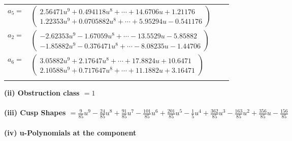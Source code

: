 \documentclass[1p]{elsarticle_modified}
\theoremstyle{definition}
\begin{document}
\begin{tabular}{m{7pt} m{180pt} m{7pt} m{180pt} }
\flushright $a_{5}=$&$\begin{pmatrix}2.56471 u^{9}+0.494118 u^{8}+\cdots+14.6706 u+1.21176\\1.22353 u^{9}+0.0705882 u^{8}+\cdots+5.95294 u-0.541176\end{pmatrix}$ \\
\flushright $a_{2}=$&$\begin{pmatrix}-2.62353 u^{9}-1.67059 u^{8}+\cdots-13.5529 u-5.85882\\-1.85882 u^{9}-0.376471 u^{8}+\cdots-8.08235 u-1.44706\end{pmatrix}$ \\
\flushright $a_{6}=$&$\begin{pmatrix}3.05882 u^{9}+2.17647 u^{8}+\cdots+17.8824 u+10.6471\\2.10588 u^{9}+0.717647 u^{8}+\cdots+11.1882 u+3.16471\end{pmatrix}$\\&\end{tabular}
\flushleft \textbf{(ii) Obstruction class $= 1$}\\~\\
\flushleft \textbf{(iii) Cusp Shapes $= \frac{9}{85} u^9-\frac{24}{85} u^8+\frac{91}{85} u^7-\frac{101}{85} u^6+\frac{201}{85} u^5-\frac{1}{5} u^4+\frac{362}{85} u^3-\frac{163}{85} u^2+\frac{356}{85} u-\frac{156}{85}$}\\~\\
\newpage\renewcommand{\arraystretch}{1}
\flushleft \textbf{(iv) u-Polynomials at the component}\newline \\
\end{document}
